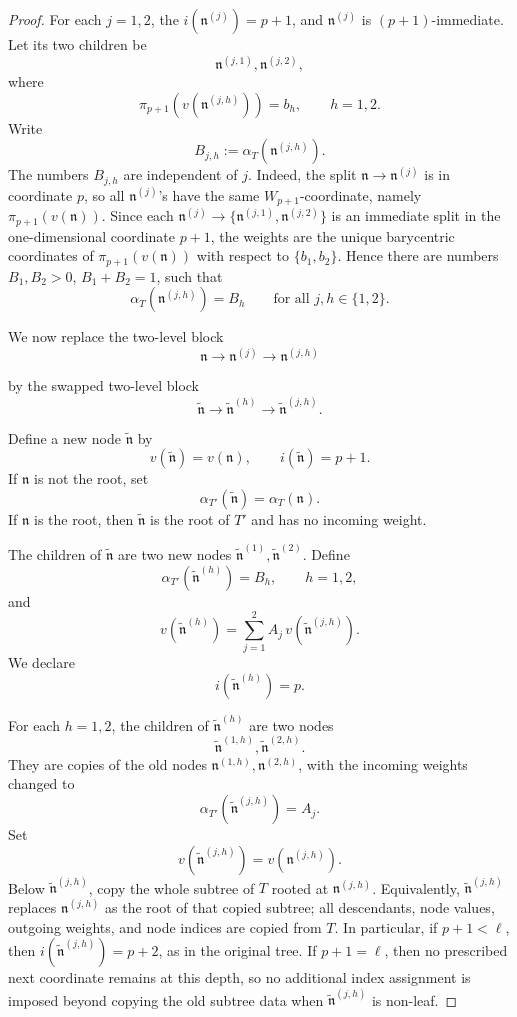 \documentclass[10pt]{amsart}
\theoremstyle{plain}
\theoremstyle{definition}
\begin{document}
\begin{proof}
For each $j=1,2$, the $i(\mathfrak{n}^{(j)}) = p+1$, and 
$\mathfrak{n}^{(j)}$
is $(p+1)$-immediate.  Let its two children be
\[
        \mathfrak{n}^{(j,1)},\mathfrak{n}^{(j,2)},
\]
where
\[
        \pi_{p+1}(v(\mathfrak{n}^{(j,h)}))=b_h,\qquad h=1,2.
\]
Write
\[
        B_{j,h}:=\alpha_T(\mathfrak{n}^{(j,h)}).
\]
The numbers $B_{j,h}$ are independent of $j$. Indeed, the split
$\mathfrak{n}\to \mathfrak{n}^{(j)}$ is in coordinate $p$, 
so all $\mathfrak{n}^{(j)}$'s have the same
$W_{p+1}$-coordinate, namely $\pi_{p+1}(v(\mathfrak{n}))$.  Since each
$\mathfrak{n}^{(j)} \to\{\mathfrak{n}^{(j,1)},\mathfrak{n}^{(j,2)}\}$ is an immediate split in the one-dimensional coordinate $p+1$, the weights are the unique barycentric coordinates of
$\pi_{p+1}(v(\mathfrak{n}))$ with respect to $\{b_1,b_2\}$.  Hence there are
numbers $B_1,B_2>0$, $B_1+B_2=1$, such that
\[
        \alpha_T(\mathfrak{n}^{(j,h)})=B_h
        \qquad
        \text{for all }j,h\in\{1,2\}.
\]

We now replace the two-level block
\[
        \mathfrak{n} \longrightarrow \mathfrak{n}^{(j)} \longrightarrow \mathfrak{n}^{(j,h)}
\]

by the swapped two-level block
\[
        \widetilde{\mathfrak{n}} \longrightarrow \widetilde{\mathfrak{n}}^{(h)} \longrightarrow \widetilde{\mathfrak{n}}^{(j,h)}.
\]

Define a new node $\widetilde{\mathfrak{n}}$ by
\[
        v(\widetilde{\mathfrak{n}})=v(\mathfrak{n}),\qquad i(\widetilde{\mathfrak{n}})=p+1.
\]
If $\mathfrak{n}$ is not the root, set
\[
        \alpha_{T'}(\widetilde{\mathfrak{n}})=\alpha_T(\mathfrak{n}).
\]
If $\mathfrak{n}$ is the root, then $\widetilde{\mathfrak{n}}$ is the root of $T'$ and has no
incoming weight.

The children of $\widetilde{\mathfrak{n}}$ are two new nodes 
$\widetilde{\mathfrak{n}}^{(1)},\widetilde{\mathfrak{n}}^{(2)}$.  Define
\[
        \alpha_{T'}(\widetilde{\mathfrak{n}}^{(h)})=B_h,\qquad h=1,2,
\]
and
\[
        v(\widetilde{\mathfrak{n}}^{(h)})=\sum_{j=1}^2 A_j\,v(\widetilde{\mathfrak{n}}^{(j,h)}).
\]
We declare
\[
        i(\widetilde{\mathfrak{n}}^{(h)})=p.
\]

For each $h=1,2$, the children of $\widetilde{\mathfrak{n}}^{(h)}$ are two nodes
\[
        \widetilde{\mathfrak{n}}^{(1,h)}, \widetilde{\mathfrak{n}}^{(2,h)}.
\]
They are copies of the old nodes $\mathfrak{n}^{(1,h)},\mathfrak{n}^{(2,h)}$, with the incoming weights changed to
\[
        \alpha_{T'}(\widetilde{\mathfrak{n}}^{(j,h)})=A_j.
\]
Set
\[
        v(\widetilde{\mathfrak{n}}^{(j,h)})=v(\mathfrak{n}^{(j,h)}).
\]
Below $\widetilde{\mathfrak{n}}^{(j,h)}$, copy the whole subtree of $T$ rooted at $\mathfrak{n}^{(j,h)}$.
Equivalently, $\widetilde{\mathfrak{n}}^{(j,h)}$ replaces 
$\mathfrak{n}^{(j,h)}$ as the root of that copied
subtree; all descendants, node values, outgoing weights, and node
indices are copied from $T$.  In particular, if $p+1<\ell$, then
$i(\widetilde{\mathfrak{n}}^{(j,h)}) = p+2$, as in the original tree.  If $p+1=\ell$,
then no prescribed next coordinate remains at this depth, so no
additional index assignment is imposed beyond copying the old subtree
data when $\widetilde{\mathfrak{n}}^{(j,h)}$ is non-leaf.


\end{proof}
\end{document}
